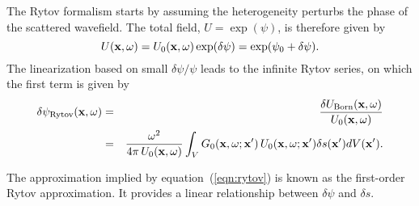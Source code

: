 \par
The Rytov formalism starts by assuming the heterogeneity perturbs the 
phase of the scattered wavefield.  The total field, $U=\exp (\psi)$,
is therefore given by
\begin{equation}
U({\bf x},\omega)=U_0({\bf x},\omega) \exp(\delta \psi) =
\exp(\psi_0+\delta \psi).
\end{equation}
The linearization based on small $\delta \psi / \psi$ leads to the
infinite Rytov series, on which the first term is given by
\begin{eqnarray} 
\delta \psi_{\rm Rytov} ({\bf x},\omega) & = &
\frac{\delta U_{\rm Born}({\bf x},\omega)}{U_0({\bf x},\omega)} \\ 
& = & \frac{\omega^2}{4 \pi \, U_0({\bf x},\omega)}
\int_V G_0({\bf x},\omega; {\bf x}')\,U_0({\bf x},\omega; {\bf x}')
\delta s({\bf x}') dV({\bf x}'). \label{eqn:rytov} 
\end{eqnarray}

\par
The approximation implied by equation~(\ref{eqn:rytov}) is known as
the first-order Rytov approximation. It provides a linear relationship
between $\delta \psi$ and $\delta s$.
